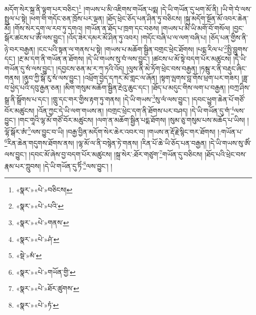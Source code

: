མདོག་སེར་སྐྲ་ནི་ལྟག་པར་བཅིང་།\footnote{«སྣར་»«པེ་»བཅིངས།} །གཡས་པ་མི་འཇིགས་གཡོན་པདྨ། །དེ་ཡི་གཡོན་དུ་ཕག་མོ་ནི། །ཡི་གེ་བཾ་ལས་སྤྲུལ་པ་སྟེ། །ཕག་གི་གདོང་ཅན་ཁྲོས་པར་ལྡན། །ཐོད་ཕྲེང་ཅོད་པན་ཤིན་ཏུ་བཅིངས། །སྐུ་མདོག་སྔོན་མོ་འབར་ཆེན་མོ། །གོས་སེར་དག་ལ་རབ་ཏུ་དགའ། །གཡོན་ན་ཐོད་པ་ཁྲག་དང་བཅས། །གཡས་པ་མི་ཡི་མགོ་བོ་གསོལ། །བྱང་སྒོར་ཚངས་པ་ཨོཾ་ལས་བྱུང་། །འོད་ཟེར་དམར་མོ་ཤིན་ཏུ་འབར། །གདོང་བཞི་པ་ལ་ལག་བཞི་པ། །ཅོད་པན་གྱིས་ནི་ཉེ་བར་བརྒྱན། །ངང་པའི་སྟན་ལ་གནས་པ་སྟེ། །གཡས་པ་མཆོག་སྦྱིན་བགྲང་ཕྲེང་ཐོགས། །པདྨ་རིལ་པ་\footnote{«སྣར་»«པེ་»པའི་}སྤྱི་བླུགས་དང་། །རྔ་མ་དག་ནི་གཡོན་ན་ཐོགས། །དེ་ཡི་གཡས་སུ་བཾ་ལས་བྱུང་། །ཚངས་པ་མོ་སྟེ་བདག་པོར་མཚུངས། །དེ་ཡི་གཡོན་དུ་སཾ་ལས་བྱུང་། །དབྱངས་ཅན་མ་ར་ཀ་ཏའི་འོད། །ལུས་ནི་མེ་ཏོག་ཕྲེང་བས་བརྒྱན། །ཏམྦུ་ར་ནི་བརྡུང་ཞིང་གནས། །ནུབ་ཀྱི་སྒོ་རུ་སཾ་ལས་བྱུང་། །འཕྲོག་བྱེད་དཀར་མོ་གླང་ལ་ཞོན། །སྟག་ལྤགས་བླ་གོས་ཕྲག་པར་གཟར། །ཟླ་བ་ཕྱེད་པའི་དབུ་རྒྱན་ཅན། །མིག་གསུམ་མཆོག་སྦྱིན་རྔེའུ་ཆུང་དང་། །ཐོད་པ་མདུང་གིས་ལག་པ་བརྒྱན། །བཀྲ་ཤིས་སྒྲ་ནི་སྒྲོགས་པ་དང་། །གླུ་དང་གར་གྱིས་རྟག་ཏུ་གནས། །དེ་ཡི་གཡས་\footnote{«སྣར་»«པེ་»གནས་}སུ་ལཾ་ལས་བྱུང་། །དབང་ཕྱུག་ཆེན་པོ་གཙོ་བོར་མཚུངས། །འོན་ཀྱང་དེ་ཡི་ལག་གཡས་ན། །བགྲང་ཕྲེང་དག་ནི་ཐོགས་པར་བཤད། །དེ་ཡི་གཡོན་དུ་གཾ་\footnote{«སྣར་»«པེ་»ཤཾ་}ལས་བྱུང་། །གང་གཱའི་ལྷ་མོ་གཙོ་བོར་མཚུངས། །ལག་ན་མཆོག་སྦྱིན་པདྨ་ཐོགས། །སུམ་ཅུ་གསུམ་པས་མཆོད་པ་ཡིས། །ལྷོ་སྒོར་ཨཾ་\footnote{«སྡེ་»མཾ་}ལས་བྱུང་བ་ཡི། །བརྒྱ་བྱིན་མདོག་སེར་ཆེར་འབར་བ། །གཡས་ན་རྡོ་རྗེ་སྙིང་གར་ཐོགས། །:གཡོན་པ་\footnote{«སྣར་»«པེ་»གཡོན་གྱི་}རིན་ཆེན་གདུགས་ཐོགས་ནས། །ལྷ་མོ་ལ་ནི་བསྙེན་ཏེ་གནས། །རིན་པོ་ཆེ་ཡི་ཅོད་པན་བརྒྱན། །དེ་ཡི་གཡས་སུ་ཨིཾ་ལས་བྱུང་། །དབང་མོ་ཞེས་བྱ་བདག་པོར་མཚུངས། །སྐྲ་སེར་:ཐོར་གཙུག་\footnote{«སྣར་»«པེ་»ཐོར་ཚུགས་}གཡོན་དུ་བཅིངས། །ཐོད་པའི་ཕྲེང་བས་རྣམ་པར་ཀླུབས། །དེ་ཡི་གཡོན་དུ་ཏིཾ་\footnote{«སྣར་»«པེ་»ཏཾ་}ལས་བྱུང་། །
